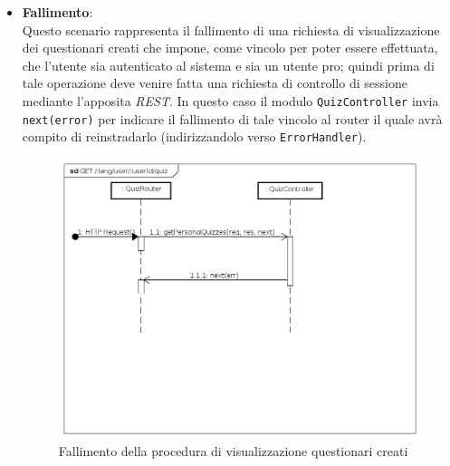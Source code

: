 \begin{itemize}
\item \textbf{Fallimento}:\\
Questo scenario rappresenta il fallimento di una richiesta di visualizzazione dei questionari creati che impone, come vincolo per poter essere effettuata, che l'utente sia autenticato al sistema e sia un utente pro; quindi prima di tale operazione deve venire fatta una richiesta di controllo di sessione mediante l'apposita \textit{REST}. In questo caso il modulo \texttt{QuizController} invia \texttt{next(error)} per indicare il fallimento di tale vincolo al router il quale avrà compito di reinstradarlo (indirizzandolo verso \texttt{ErrorHandler}).
\label{Fallimento della procedura di visualizzazione questionari creati}
\begin{figure}[ht]
	\centering
	\includegraphics[scale=0.40]{UML/DiagrammiDiSequenza/Back-end/GET__lang_user_userId_quiz_failure.png}
	\caption{Fallimento della procedura di visualizzazione questionari creati}
\end{figure}
\FloatBarrier
\end{itemize}

